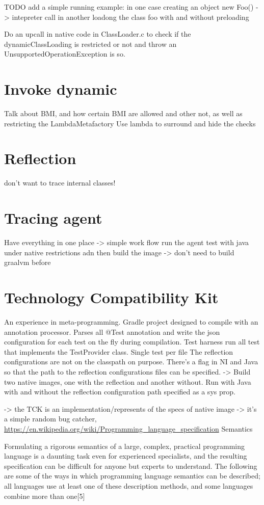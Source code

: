 TODO add a simple running example: in one case creating an object new Foo() -> intepreter call
in another loadong the class foo with and without preloading

Do an upcall in native code in ClassLoader.c to check if the dynamicClassLoading is restricted or not and throw an UnsupportedOperationException is so.

\section{Invoke dynamic}
Talk about BMI, and how certain BMI are allowed and other not, as well as restricting the LambdaMetafactory
Use lambda to surround and hide the checks
\section{Reflection}
don't want to trace internal classes!

\section{Tracing agent}
Have everything in one place -> simple work flow run the agent test with java under native restrictions adn then build the image -> don't need to build graalvm before
\section{Technology Compatibility Kit}
An experience in meta-programming.
Gradle project designed to compile with an annotation processor. Parses all @Test annotation and write the json configuration for each test on the fly
during compilation.
Test harness run all test that implements the TestProvider class. Single test per file
The reflection configurations are not on the classpath on purpose. There's a flag in NI and Java so that the path to the reflection configurations files can be specified.
-> Build two native images, one with the reflection and another without. Run with Java with and without the reflection configuration path specified as a sys prop.

-> the TCK is an implementation/represents of the specs of native image
-> it's a simple random bug catcher, 
\url{https://en.wikipedia.org/wiki/Programming_language_specification}
Semantics

Formulating a rigorous semantics of a large, complex, practical programming language is a daunting task even for experienced specialists, and the resulting specification can be difficult for anyone but experts to understand. The following are some of the ways in which programming language semantics can be described; all languages use at least one of these description methods, and some languages combine more than one[5]

